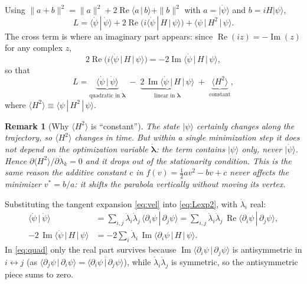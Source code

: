 \documentclass[12pt,a4paper]{article}
\newcommand{\ket}[1]{\lvert #1 \rangle}
\newcommand{\braket}[2]{\langle #1 \,|\, #2 \rangle}
\newcommand{\mel}[3]{\langle #1 \,|\, #2 \,|\, #3 \rangle}
\newcommand{\re}{\operatorname{Re}}
\newcommand{\im}{\operatorname{Im}}
\newcommand{\dlam}{\dot{\boldsymbol{\lambda}}}
\newtheorem{remark}{Remark}[section]
\begin{document}
Using $\|a+b\|^2=\|a\|^2+2\re\braket{a}{b}+\|b\|^2$ with $a=\ket{\dot\psi}$ and $b=iH\ket{\psi}$,
\begin{equation}
  L=\braket{\dot\psi}{\dot\psi}+2\re\!\big(i\mel{\dot\psi}{H}{\psi}\big)+\mel{\psi}{H^2}{\psi}.
  \label{eq:Lexp1}
\end{equation}
The cross term is where an imaginary part appears: since $\re(iz)=-\im(z)$ for any complex $z$,
\begin{equation}
  2\re\!\big(i\mel{\dot\psi}{H}{\psi}\big)=-2\im\mel{\dot\psi}{H}{\psi},
  \label{eq:crossterm}
\end{equation}
so that
\begin{equation}
  L=\underbrace{\braket{\dot\psi}{\dot\psi}}_{\text{quadratic in }\dlam}
   \;-\;\underbrace{2\,\im\mel{\dot\psi}{H}{\psi}}_{\text{linear in }\dlam}
   \;+\;\underbrace{\langle H^2\rangle}_{\text{constant}},
  \label{eq:Lexp2}
\end{equation}
where $\langle H^2\rangle\equiv\mel{\psi}{H^2}{\psi}$.

\begin{remark}[Why $\langle H^2\rangle$ is ``constant'']
The state $\ket{\psi}$ certainly changes along the trajectory, so $\langle H^2\rangle$ changes
\emph{in time}. But within a single minimization step it does not depend on the optimization
variable $\dlam$: the term contains $\ket{\psi}$ only, never $\ket{\dot\psi}$. Hence
$\partial\langle H^2\rangle/\partial\dot\lambda_k=0$ and it drops out of the stationarity condition.
This is the same reason the additive constant $c$ in $f(v)=\tfrac12 a v^2-bv+c$ never affects the
minimizer $v^\ast=b/a$: it shifts the parabola vertically without moving its vertex.
\end{remark}

Substituting the tangent expansion \eqref{eq:vel} into \eqref{eq:Lexp2}, with $\dot\lambda_i$ real:
\begin{align}
  \braket{\dot\psi}{\dot\psi}
    &=\sum_{i,j}\dot\lambda_i\dot\lambda_j\,\braket{\partial_i\psi}{\partial_j\psi}
     =\sum_{i,j}\dot\lambda_i\dot\lambda_j\,\re\braket{\partial_i\psi}{\partial_j\psi},
     \label{eq:quad}\\[2pt]
  -2\,\im\mel{\dot\psi}{H}{\psi}
    &=-2\sum_i\dot\lambda_i\,\im\mel{\partial_i\psi}{H}{\psi}.
     \label{eq:lin}
\end{align}
In \eqref{eq:quad} only the real part survives because
$\im\braket{\partial_i\psi}{\partial_j\psi}$ is antisymmetric in $i\leftrightarrow j$
(as $\braket{\partial_j\psi}{\partial_i\psi}=\overline{\braket{\partial_i\psi}{\partial_j\psi}}$),
while $\dot\lambda_i\dot\lambda_j$ is symmetric, so the antisymmetric piece sums to zero.
\end{document}
